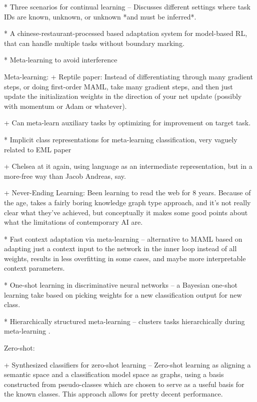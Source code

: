 * Three scenarios for continual learning -- Discusses different settings where task IDs are known, unknown, or unknown *and must be inferred*. \citep{Ven2018}

* A chinese-restaurant-processed based adaptation system for model-based RL, that can handle multiple tasks without boundary marking. \citep{Nagabandi2019}

* Meta-learning to avoid interference \citep{Velez2017}



Meta-learning:
+ Reptile paper: Instead of differentiating through many gradient steps, or doing first-order MAML, take many gradient steps, and then just update the initialization weights in the direction of your net update (possibly with momentum or Adam or whatever). \citep{Nichol2018} 

+ Can meta-learn auxiliary tasks by optimizing for improvement on target task. \citep{Liu2019a}

* Implicit class representations for meta-learning classification, very vaguely related to EML paper \citep{Ravichandran2019}

+ Chelsea at it again, using language as an intermediate representation, but in a more-free way than Jacob Andreas, say. \citep{Jiang2019}

+ Never-Ending Learning: Been learning to read the web for 8 years. Because of the age, takes a fairly boring knowledge graph type approach, and it's not really clear what they've achieved, but conceptually it makes some good points about what the limitations of contemporary AI are. \citep{Mitchell2018}

* Fast context adaptation via meta-learning -- alternative to MAML based on adapting just a context input to the network in the inner loop instead of all weights, results in less overfitting in some cases, and maybe more interpretable context parameters. \citep{Zintgraf2018}

* One-shot learning in discriminative neural networks -- a Bayesian one-shot learning take based on picking weights for a new classification output for new class. \citep{Burgess2016}

* Hierarchically structured meta-learning -- clusters tasks hierarchically during meta-learning \citep{Yao2019}.



Zero-shot:

+ Synthesized classifiers for zero-shot learning -- Zero-shot learning as aligning a semantic space and a classification model space as graphs, using a basis constructed from pseudo-classes which are chosen to serve as a useful basis for the known classes. This approach allows for pretty decent performance. \citep{Changpinyo2016} 

